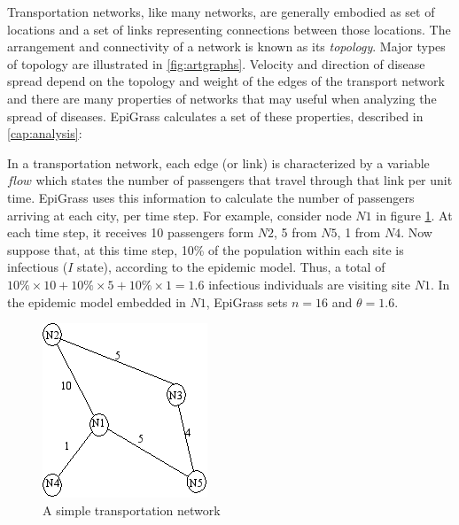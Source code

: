 Transportation networks, like many networks, are generally embodied as set of locations and a set of links representing connections between those locations. The arrangement and connectivity of a network is known as its \textit{topology}. Major types of topology are illustrated in \ref{fig:artgraphs}. Velocity and direction of disease spread depend on the topology and weight of the edges of the transport network and there are many properties of networks that may useful when analyzing the spread of diseases. EpiGrass calculates a set of these properties, described in \ref{cap:analysis}: 

In a transportation network, each edge (or link) is characterized by a variable $flow$ which states the number of passengers that travel through that link per unit time. EpiGrass uses this information to calculate the number of passengers arriving at each city, per time step. For example, consider node $N1$ in figure \ref{fig:simpnet}. At each time step, it receives 10 passengers form $N2$, 5 from $N5$, 1 from $N4$. Now suppose that, at this time step, 10\% of the population within each site is infectious ($I$ state), according to the epidemic model. Thus, a total of $10\% \times 10 + 10\% \times 5 + 10\% \times 1 = 1.6$ infectious individuals are visiting site $N1$. In the epidemic model embedded in $N1$, EpiGrass sets $n = 16$ and $\theta = 1.6$. 


\begin{figure}[ht]
\begin{center}
	\includegraphics[scale=1.2]{simplenet.png}
\caption{A simple transportation network}
\label{fig:simpnet}
\end{center}
\end{figure}



